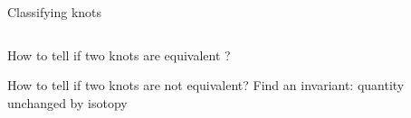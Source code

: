 \documentclass[11pt,xcolor=dvipsnames,presentation,aspectratio=169]{beamer}
\begin{document}
\begin{frame}{Classifying knots}

  \begin{columns}
    \begin{column}{.5\linewidth}
      \begin{block}{How to tell if two knots are equivalent ?}
        \centering
      \end{block}

      \begin{block}{How to tell if two knots are not equivalent?}
        Find an invariant: quantity unchanged by isotopy
      \end{block}
    \end{column}
    \hfill
    \begin{column}{.45\linewidth}
    \end{column}
  \end{columns}
\end{frame}
\end{document}
